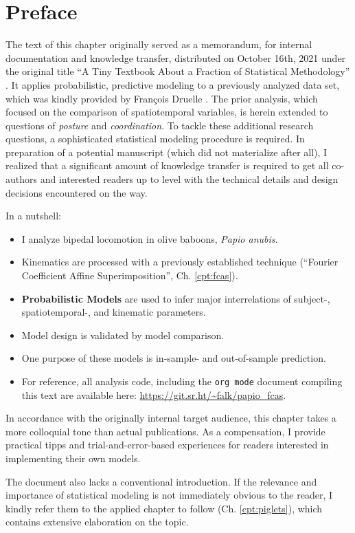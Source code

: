 
\clearpage

\section{Preface}
\label{sec:orgcfa10a1}
The text of this chapter originally served as a memorandum, for internal documentation and knowledge transfer, distributed on October 16th, 2021 under the original title ``A Tiny Textbook About a Fraction of Statistical Methodology'' .
It applies probabilistic, predictive modeling to a previously analyzed data set, which was kindly provided by François Druelle \citep[][]{Druelle2021}.
The prior analysis, which focused on the comparison of spatiotemporal variables, is herein extended to questions of \emph{posture} and \emph{coordination}.
To tackle these additional research questions, a sophisticated statistical modeling procedure is required.
In preparation of a potential manuscript (which did not materialize after all), I realized that a significant amount of knowledge transfer is required to get all co-authors and interested readers up to level with the technical details and design decisions encountered on the way.


In a nutshell:
\begin{itemize}
\item I analyze bipedal locomotion in olive baboons, \emph{Papio anubis}.
\item Kinematics are processed with a previously established technique (``Fourier Coefficient Affine Superimposition'', Ch. \ref{cpt:fcas}).
\item \textbf{Probabilistic Models} are used to infer major interrelations of subject-, spatiotemporal-, and kinematic parameters.
\item Model design is validated by model comparison.
\item One purpose of these models is in-sample- and out-of-sample prediction.
\item For reference, all analysis code, including the \texttt{org mode} document compiling this text are available here: \url{https://git.sr.ht/\~falk/papio\_fcas}.
\end{itemize}

In accordance with the originally internal target audience, this chapter takes a more colloquial tone than actual publications.
As a compensation, I provide practical tipps and trial-and-error-based experiences for readers interested in implementing their own models.

The document also lacks a conventional introduction.
If the relevance and importance of statistical modeling is not immediately obvious to the reader, I kindly refer them to the applied chapter to follow (Ch. \ref{cpt:piglets}), which contains extensive elaboration on the topic.


